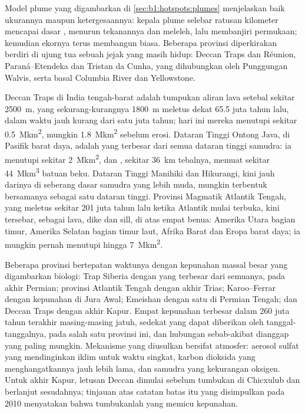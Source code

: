 \noindent Model plume yang digambarkan di \cref{sec:b1:hotspots:plumes} menjelaskan baik ukurannya maupun ketergesaannya: kepala plume selebar ratusan kilometer mencapai dasar , menurun tekanannya dan meleleh, lalu membanjiri permukaan; kemudian ekornya terus membangun  biasa. Beberapa provinsi diperkirakan berdiri di ujung tua sebuah jejak yang masih hidup: Deccan Traps dan  Réunion, Paraná--Etendeka dan Tristan da Cunha, yang dihubungkan oleh Punggungan Walvis, serta basal Columbia River dan Yellowstone.

Deccan Traps di India tengah-barat adalah tumpukan aliran lava setebal sekitar \qty{2500}{m}, yang sekurang-kurangnya \qty{1800}{m} meletus dekat 65.5 juta tahun lalu, dalam waktu jauh kurang dari satu juta tahun; hari ini mereka menutupi sekitar \qty{0.5}{\mega km^2}, mungkin \qty{1.8}{\mega km^2} sebelum erosi. Dataran Tinggi Ontong Java, di Pasifik barat daya, adalah yang terbesar dari semua dataran tinggi samudra: ia menutupi sekitar \qty{2}{\mega km^2}, dan , sekitar \qty{36}{km} tebalnya, memuat sekitar \qty{44}{\mega km^3} batuan beku. Dataran Tinggi Manihiki dan Hikurangi, kini jauh darinya di seberang dasar samudra yang lebih muda, mungkin terbentuk bersamanya sebagai satu dataran tinggi. Provinsi Magmatik Atlantik Tengah, yang meletus sekitar 201 juta tahun lalu ketika Atlantik mulai terbuka, kini tersebar, sebagai lava, dike dan sill, di atas empat benua: Amerika Utara bagian timur, Amerika Selatan bagian timur laut, Afrika Barat dan Eropa barat daya; ia mungkin pernah menutupi hingga \qty{7}{\mega km^2}.


Beberapa provinsi bertepatan waktunya dengan kepunahan massal besar yang digambarkan biologi: Trap Siberia dengan yang terbesar dari semuanya, pada akhir Permian; provinsi Atlantik Tengah dengan akhir Trias; Karoo--Ferrar dengan kepunahan di Jura Awal; Emeishan dengan satu di Permian Tengah; dan Deccan Traps dengan akhir Kapur. Empat kepunahan terbesar dalam 260 juta tahun terakhir masing-masing jatuh, sedekat yang dapat diberikan oleh tanggal-tanggalnya, pada salah satu provinsi ini, dan hubungan sebab-akibat dianggap yang paling mungkin. Mekanisme yang diusulkan bersifat atmosfer: aerosol sulfat yang mendinginkan iklim untuk waktu singkat, karbon dioksida yang menghangatkannya jauh lebih lama, dan samudra yang kekurangan oksigen. Untuk akhir Kapur, letusan Deccan dimulai sebelum tumbukan di Chicxulub dan berlanjut sesudahnya; tinjauan atas catatan batas itu yang disimpulkan pada 2010 menyatakan bahwa tumbukanlah yang memicu kepunahan.

